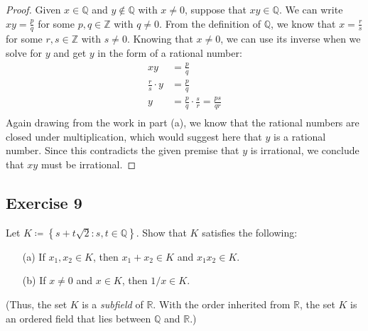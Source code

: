 \documentclass[12pt]{article}
\begin{document}
\begin{itemize}
\begin{proof}
Given $x \in \mathbb{Q}$ and $y \notin \mathbb{Q}$ with $x \neq 0$, suppose that $xy \in \mathbb{Q}$. We can write $xy = \frac{p}{q}$ for some $p, q \in \mathbb{Z}$ with $q \neq 0$. From the definition of $\mathbb{Q}$, we know that $x = \frac{r}{s}$ for some $r, s \in \mathbb{Z}$ with $s \neq 0$. Knowing that $x \neq 0$, we can use its inverse when we solve for $y$ and get $y$ in the form of a rational number:
\begin{align*}
xy &= \frac{p}{q} \\
\frac{r}{s} \cdot y &= \frac{p}{q} \\
y &= \frac{p}{q} \cdot \frac{s}{r} = \frac{ps}{qr} \\
\end{align*}
Again drawing from the work in part (a), we know that the rational numbers are closed under multiplication, which would suggest here that $y$ is a rational number. Since this contradicts the given premise that $y$ is irrational, we conclude that $xy$ must be irrational.
\end{proof}
\end{itemize}

\subsection*{Exercise 9}
Let $K \coloneqq \left\{s + t\sqrt{2} : s, t \in \mathbb{Q}\right\}$. Show that $K$ satisfies the following:
\begin{itemize}
\item[(a)] If $x_1, x_2 \in K$, then $x_1 + x_2 \in K$ and $x_1x_2 \in K$.
\item[(b)] If $x \neq 0$ and $x \in K$, then $1/x \in K$.
\end{itemize}
(Thus, the set $K$ is a {\it subfield} of $\mathbb{R}$. With the order inherited from $\mathbb{R}$, the set $K$ is an ordered field that lies between $\mathbb{Q}$ and $\mathbb{R}$.)
\end{document}
